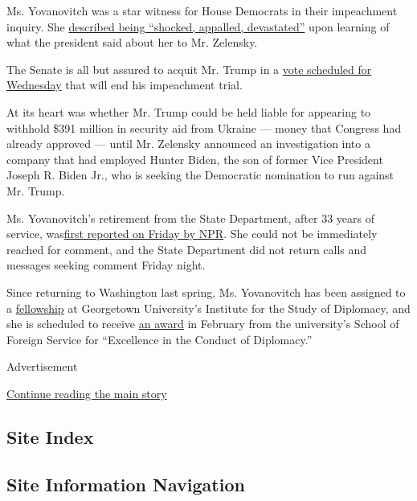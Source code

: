 Ms. Yovanovitch was a star witness for House Democrats in their
impeachment inquiry. She
\href{https://www.nytimes.com/2019/11/15/us/politics/marie-yovanovitch-testimony.html}{described
being ``shocked, appalled, devastated''} upon learning of what the
president said about her to Mr. Zelensky.

The Senate is all but assured to acquit Mr. Trump in a
\href{https://www.nytimes.com/live/2020/trump-impeachment-trial-01-31?action=click\&module=Spotlight\&pgtype=Homepage}{vote
scheduled for Wednesday} that will end his impeachment trial.

At its heart was whether Mr. Trump could be held liable for appearing to
withhold \$391 million in security aid from Ukraine --- money that
Congress had already approved --- until Mr. Zelensky announced an
investigation into a company that had employed Hunter Biden, the son of
former Vice President Joseph R. Biden Jr., who is seeking the Democratic
nomination to run against Mr. Trump.

Ms. Yovanovitch's retirement from the State Department, after 33 years
of service,
was\href{https://www.npr.org/2020/01/31/801697400/ukraine-ambassador-marie-yovanovitch-key-figure-in-impeachment-trial-retires}{first
reported on Friday by NPR}. She could not be immediately reached for
comment, and the State Department did not return calls and messages
seeking comment Friday night.

Since returning to Washington last spring, Ms. Yovanovitch has been
assigned to a
\href{https://isd.georgetown.edu/profile/amb-marie-l-yovanovitch/}{fellowship}
at Georgetown University's Institute for the Study of Diplomacy, and she
is scheduled to receive
\href{https://sfs.georgetown.edu/event/trainor-award-to-amb-marie-yovanovitch/}{an
award} in February from the university's School of Foreign Service for
``Excellence in the Conduct of Diplomacy.''

Advertisement

\protect\hyperlink{after-bottom}{Continue reading the main story}

\hypertarget{site-index}{%
\subsection{Site Index}\label{site-index}}

\hypertarget{site-information-navigation}{%
\subsection{Site Information
Navigation}\label{site-information-navigation}}

